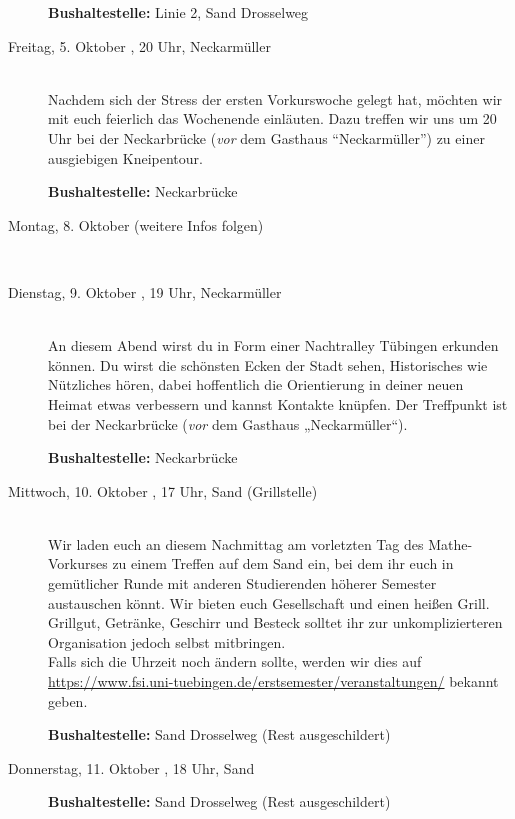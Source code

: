 \begin{description}
\textbf{Bushaltestelle:} Linie 2, Sand Drosselweg
\fi
\fi


\item[Freitag, 5. Oktober \Jahr, 20 Uhr, Neckarmüller]\ \\
Nachdem sich der Stress der ersten Vorkurswoche gelegt hat, möchten wir mit euch feierlich das Wochenende einläuten. 
Dazu treffen wir uns um 20 Uhr bei der Neckarbrücke (\emph{vor} dem Gasthaus "`Neckarmüller"') zu einer ausgiebigen Kneipentour.

\textbf{Bushaltestelle:} Neckarbrücke 


\ifkogwiss
\item[Montag, 8. Oktober \Jahr (weitere Infos folgen)] \\

\fi

\item[Dienstag, 9. Oktober \Jahr, 19 Uhr, Neckarmüller] \\ 
An diesem Abend wirst du in Form einer Nachtralley Tübingen erkunden können. Du wirst die schönsten Ecken der Stadt sehen, Historisches wie Nützliches hören, dabei hoffentlich die Orientierung in deiner neuen Heimat etwas verbessern und kannst Kontakte knüpfen. Der Treffpunkt ist bei der Neckarbrücke (\emph{vor} dem Gasthaus „Neckarmüller“).

\textbf{Bushaltestelle:} Neckarbrücke 

\item[Mittwoch, 10. Oktober \Jahr, 17 Uhr, Sand (Grillstelle)] \\
Wir laden euch an diesem Nachmittag am vorletzten Tag des Mathe-Vorkurses zu
einem Treffen auf dem Sand ein, bei dem ihr euch in gemütlicher Runde mit
anderen Studierenden höherer Semester austauschen könnt. Wir bieten euch
Gesellschaft und einen heißen Grill.
Grillgut, Getränke, Geschirr und Besteck solltet ihr zur unkomplizierteren Organisation jedoch selbst mitbringen.\\
Falls sich die Uhrzeit noch ändern sollte, werden wir dies auf \\ \url{https://www.fsi.uni-tuebingen.de/erstsemester/veranstaltungen/} bekannt geben.

\textbf{Bushaltestelle:} Sand Drosselweg (Rest ausgeschildert)

\item[Donnerstag, 11. Oktober \Jahr, 18 Uhr, Sand]

\textbf{Bushaltestelle:} Sand Drosselweg (Rest ausgeschildert)



\end{description}
